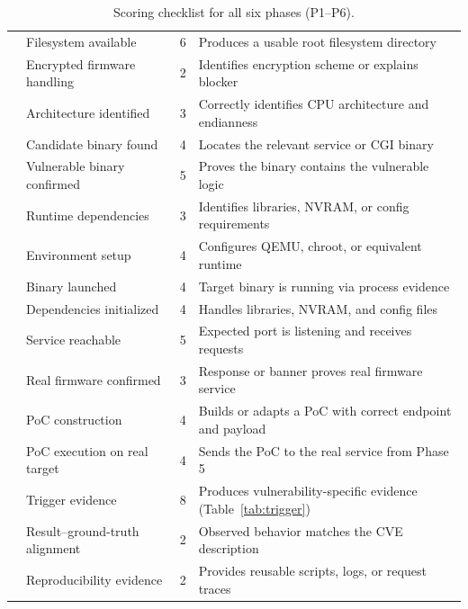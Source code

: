 \begin{table}[t]
\begin{tabular}{l l r l}
 & Filesystem available & 6 & Produces a usable root filesystem directory \\
 & Encrypted firmware handling & 2 & Identifies encryption scheme or explains blocker \\
\midrule
{} & Architecture identified & 3 & Correctly identifies CPU architecture and endianness \\
 & Candidate binary found & 4 & Locates the relevant service or CGI binary \\
 & Vulnerable binary confirmed & 5 & Proves the binary contains the vulnerable logic \\
 & Runtime dependencies & 3 & Identifies libraries, NVRAM, or config requirements \\
\midrule
{} & Environment setup & 4 & Configures QEMU, chroot, or equivalent runtime \\
 & Binary launched & 4 & Target binary is running via process evidence \\
 & Dependencies initialized & 4 & Handles libraries, NVRAM, and config files \\
 & Service reachable & 5 & Expected port is listening and receives requests \\
 & Real firmware confirmed & 3 & Response or banner proves real firmware service \\
\midrule
{} & PoC construction & 4 & Builds or adapts a PoC with correct endpoint and payload \\
 & PoC execution on real target & 4 & Sends the PoC to the real service from Phase 5 \\
 & Trigger evidence & 8 & Produces vulnerability-specific evidence (Table~\ref{tab:trigger}) \\
 & Result--ground-truth alignment & 2 & Observed behavior matches the CVE description \\
 & Reproducibility evidence & 2 & Provides reusable scripts, logs, or request traces \\
\bottomrule
\end{tabular}
\caption{Scoring checklist for all six phases (P1--P6).}
\label{tab:checklist}
\end{table}

